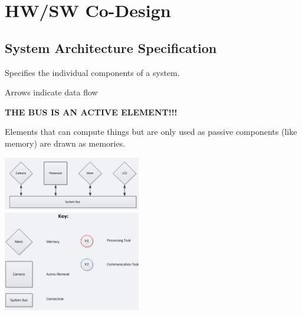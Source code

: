 \section{HW/SW Co-Design }
	\subsection{System Architecture Specification}
	
		\begin{compactitem}
		  \item Specifies the individual components of a system.
		  \item Arrows indicate data flow
		  \item {\color{red}\textbf{THE BUS IS AN ACTIVE ELEMENT!!!}}
		  \item Elements that can compute things but are only used as passive components (like memory) are drawn as memories.
		\end{compactitem}
		
		\begin{multicols}{2}
			\includegraphics[width=0.45\textwidth]{./pictures/systemArchDiagram.png} \\
			\includegraphics[width=0.45\textwidth]{./pictures/systemArchKey.png}
		\end{multicols}
	
\newpage		

